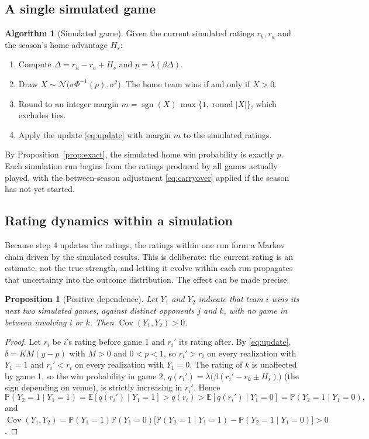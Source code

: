 \documentclass[11pt]{article}
\newcommand{\E}{\mathbb{E}}
\newcommand{\Prob}{\mathbb{P}}
\newcommand{\Cov}{\operatorname{Cov}}
\newcommand{\sgn}{\operatorname{sgn}}
\theoremstyle{plain}
\newtheorem{proposition}{Proposition}
\theoremstyle{definition}
\newtheorem{algorithm}{Algorithm}
\theoremstyle{remark}
\begin{document}
\subsection{A single simulated game}

\begin{algorithm}[Simulated game]\label{alg:game}
Given the current simulated ratings $r_h, r_a$ and the season's home advantage $H_s$:
\begin{enumerate}
  \item Compute $\Delta = r_h - r_a + H_s$ and $p = \lambda(\beta\Delta)$.
  \item Draw $X \sim \mathcal{N}\bigl(\sigma\Phi^{-1}(p), \sigma^2\bigr)$. The home team wins if and only if $X > 0$.
  \item Round to an integer margin $m = \sgn(X)\,\max\{1, \operatorname{round}|X|\}$, which excludes ties.
  \item Apply the update \eqref{eq:update} with margin $m$ to the simulated ratings.
\end{enumerate}
\end{algorithm}

By Proposition~\ref{prop:exact}, the simulated home win probability is exactly $p$. Each simulation run begins from the ratings produced by all games actually played, with the between-season adjustment \eqref{eq:carryover} applied if the season has not yet started.

\subsection{Rating dynamics within a simulation}

Because step 4 updates the ratings, the ratings within one run form a Markov chain driven by the simulated results. This is deliberate: the current rating is an estimate, not the true strength, and letting it evolve within each run propagates that uncertainty into the outcome distribution. The effect can be made precise.

\begin{proposition}[Positive dependence]\label{prop:cov}
Let $Y_1$ and $Y_2$ indicate that team $i$ wins its next two simulated games, against distinct opponents $j$ and $k$, with no game in between involving $i$ or $k$. Then $\Cov(Y_1, Y_2) > 0$.
\end{proposition}
\begin{proof}
Let $r_i$ be $i$'s rating before game 1 and $r_i'$ its rating after. By \eqref{eq:update}, $\delta = KM(y - p)$ with $M > 0$ and $0 < p < 1$, so $r_i' > r_i$ on every realization with $Y_1 = 1$ and $r_i' < r_i$ on every realization with $Y_1 = 0$. The rating of $k$ is unaffected by game 1, so the win probability in game 2, $q(r_i') = \lambda\bigl(\beta(r_i' - r_k \pm H_s)\bigr)$ (the sign depending on venue), is strictly increasing in $r_i'$. Hence
\[
  \Prob(Y_2 = 1 \mid Y_1 = 1) = \E[q(r_i') \mid Y_1 = 1] > q(r_i) > \E[q(r_i') \mid Y_1 = 0] = \Prob(Y_2 = 1 \mid Y_1 = 0),
\]
and $\Cov(Y_1,Y_2) = \Prob(Y_1 = 1)\Prob(Y_1 = 0)\bigl[\Prob(Y_2 = 1\mid Y_1=1) - \Prob(Y_2=1\mid Y_1=0)\bigr] > 0$.
\end{proof}
\end{document}
